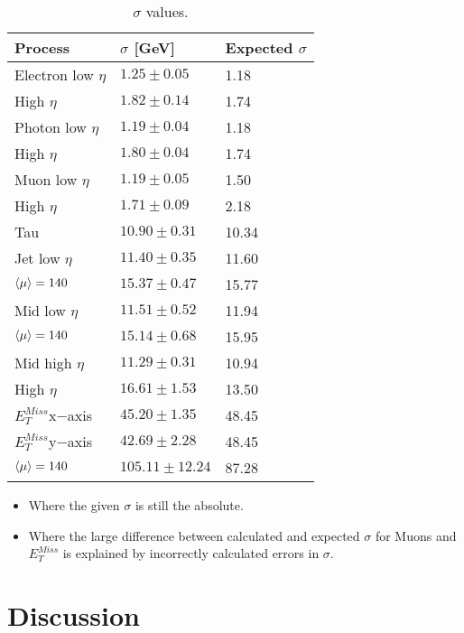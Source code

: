 \begin{table}[H]
\begin{center}
\begin{tabular}{|l|l|l|}
\hline
Process&$\sigma$ [GeV]&Expected $\sigma$\\ \hline
Electron low $\eta$&$1.25 \pm 0.05$&1.18\\
High $\eta$&$1.82 \pm 0.14$&1.74\\ \hline
Photon low $\eta$&$1.19 \pm 0.04$&1.18\\
High $\eta$&$1.80 \pm 0.04$&1.74\\ \hline
Muon low $\eta$&$1.19 \pm 0.05$&1.50\\
High $\eta$&$1.71 \pm 0.09$&2.18\\ \hline
Tau&$10.90 \pm 0.31$&10.34\\ \hline
Jet low $\eta$&$11.40 \pm 0.35$&11.60\\
$\left<\mu\right>=140$&$15.37 \pm 0.47$&15.77\\
Mid low $\eta$&$11.51 \pm 0.52$&11.94\\
$\left<\mu\right>=140$&$15.14 \pm 0.68$&15.95\\
Mid high $\eta$&$11.29 \pm 0.31$&10.94\\
High $\eta$&$16.61 \pm 1.53$&13.50\\ \hline
$E_T^{Miss} $x$-$axis&$45.20 \pm 1.35$&48.45\\ \hline
$E_T^{Miss} $y$-$axis&$42.69 \pm 2.28$&48.45\\ 
$\left<\mu\right>=140$&$105.11 \pm 12.24$&87.28\\  \hline
\end{tabular}
\end{center}
\caption{$\sigma$ values.}
\label{tab:sigmaval}
\end{table}
\begin{itemize}
\item Where the given $\sigma$ is still the absolute. 
\item Where the large difference between calculated and expected $\sigma$ for Muons and $E_T^{Miss}$ is explained by incorrectly calculated errors in $\sigma$.  
\end{itemize}
\newpage
\section{Discussion}
